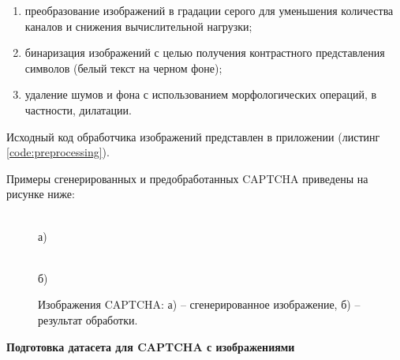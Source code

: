 \begin{enumerate}
    \item преобразование изображений в градации серого для уменьшения количества 
    каналов и снижения вычислительной нагрузки;
    \item бинаризация изображений с целью получения контрастного представления 
    символов (белый текст на черном фоне);
    \item удаление шумов и фона с использованием морфологических операций, в 
    частности, дилатации.
\end{enumerate}

Исходный код обработчика изображений представлен в приложении (листинг~
\ref{code:preprocessing}).

Примеры сгенерированных и предобработанных CAPTCHA приведены на рисунке ниже:

\begin{figure}[H]
    \centering
    \begin{minipage}[h]{0.45\linewidth}
        \\ а)
    \end{minipage}
    \begin{minipage}[h]{0.45\linewidth}
        \\ б)
    \end{minipage}
    \caption{Изображения CAPTCHA: а) -- сгенерированное изображение, б) -- 
    результат обработки.}
    \label{fig:example-captcha}
\end{figure}

\vspace{-0.7cm}

\textbf{Подготовка датасета для CAPTCHA с изображениями}

